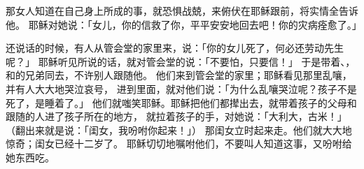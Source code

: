 {那女人知道在自己身上所成的事，就恐惧战兢，来俯伏在耶稣跟前，将实情全告诉他。
耶稣对她说：「女儿，你的信救了你，平平安安地回去吧！你的灾病痊愈了。」
\par }{\PP {}还说话的时候，有人从管会堂的家里来，说：「你的女儿死了，何必还劳动先生呢？」
耶稣听见所说的话，就对管会堂的说：「不要怕，只要信！」
于是带着{}、{}，和{}的兄弟{}同去，不许别人跟随他。
他们来到管会堂的家里；耶稣看见那里乱嚷，并有人大大地哭泣哀号，
进到里面，就对他们说：「为什么乱嚷哭泣呢？孩子不是死了，是睡着了。」
他们就嗤笑耶稣。耶稣把他们都撵出去，就带着孩子的父母和跟随的人进了孩子所在的地方，
就拉着孩子的手，对她说：「大利大，古米！」（翻出来就是说：「闺女，我吩咐你起来！」）
那闺女立时起来走。他们就大大地惊奇；闺女已经十二岁了。
耶稣切切地嘱咐他们，不要叫人知道这事，又吩咐给她东西吃。

}
